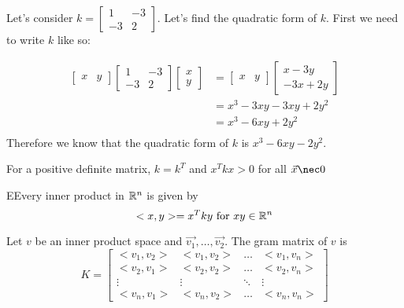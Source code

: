 	\begin{problem}
		Let's consider $k=\begin{bmatrix} 1&-3\\-3&2 \end{bmatrix}$. Let's find the quadratic form of $k$. First we need to write $k$ like so:

		\begin{align}
			\begin{bmatrix} x&y \end{bmatrix} \begin{bmatrix} 1&-3\\-3&2 \end{bmatrix} \begin{bmatrix} x\\y \end{bmatrix} &=\begin{bmatrix} x&y \end{bmatrix} \begin{bmatrix} x-3y\\-3x+2y \end{bmatrix} \\
					 &=x^3-3xy-3xy+2y^2\\
					 &=x^3-6xy+2y^2\\
		\end{align}
		 Therefore we know that the quadratic form of $k$ is $x^3-6xy-2y^2$.
	\end{problem}

  For a positive definite matrix, $k=k^{T}$ and $x^{T}kx>0$ for all $\vec{x}\nec 0$

  \begin{theorem}
    EEvery inner product in $\mathbb{R}^n$ is given by 
    \begin{equation}
      <x,y> = x^{T}ky \text{ for }xy\in\mathbb{R}^n
    \end{equation}

    Let $v$ be an inner product space and $\vec{v_1},\ldots,\vec{v_2}$. The gram matrix of $v$ is 
    \begin{equation}
      K=
      \begin{bmatrix} 
        <v_1,v_2>&<v_1,v_2>&\ldots&<v_1,v_n>\\
        <v_2,v_1>&<v_2,v_2>&\ldots&<v_2,v_n>\\
        \vdots&\vdots&\ddots&\vdots\\
        <v_n,v_1>&<v_n,v_2>&\ldots&<v_n,v_n>
      \end{bmatrix} 
    \end{equation}
  \end{theorem}

